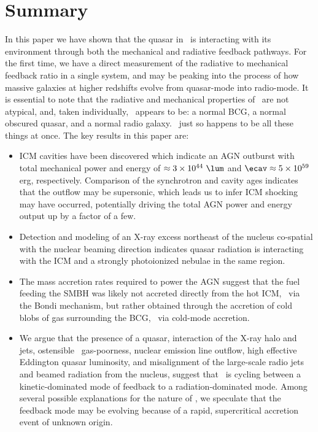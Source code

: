 \documentclass[useAMS,usenatbib]{mn2e}
\begin{document}
\section{Summary}
\label{sec:summ}

In this paper we have shown that the quasar in \inine\ is interacting
with its environment through both the mechanical and radiative
feedback pathways. For the first time, we have a direct measurement of
the radiative to mechanical feedback ratio in a single system, and may
be peaking into the process of how massive galaxies at higher
redshifts evolve from quasar-mode into radio-mode. It is essential to
note that the radiative and mechanical properties of \irs\ are not
atypical, and, taken individually, \irs\ appears to be: a normal BCG,
a normal obscured quasar, and a normal radio galaxy. \irs\ just so
happens to be all these things at once. The key results in this paper
are:
\begin{itemize}
\item ICM cavities have been discovered which indicate an AGN outburst
  with total mechanical power and energy of $\approx 3 \times 10^{44}
  ~\lum$ and $\ecav \approx 5 \times 10^{59}$ erg,
  respectively. Comparison of the synchrotron and cavity ages
  indicates that the outflow may be supersonic, which leads us to
  infer ICM shocking may have occurred, potentially driving the total
  AGN power and energy output up by a factor of a few.
\item Detection and modeling of an X-ray excess northeast of the
  nucleus co-spatial with the nuclear beaming direction indicates
  quasar radiation is interacting with the ICM and a strongly
  photoionized nebulae in the same region.
\item The mass accretion rates required to power the AGN suggest that
  the fuel feeding the SMBH was likely not accreted directly from the
  hot ICM, \ie\ via the Bondi mechanism, but rather obtained through
  the accretion of cold blobs of gas surrounding the BCG, \ie\ via
  cold-mode accretion.
\item We argue that the presence of a quasar, interaction of the X-ray
  halo and jets, ostensible \irs\ gas-poorness, nuclear emission line
  outflow, high effective Eddington quasar luminosity, and
  misalignment of the large-scale radio jets and beamed radiation from
  the nucleus, suggest that \irs\ is cycling between a
  kinetic-dominated mode of feedback to a radiation-dominated
  mode. Among several possible explanations for the nature of \irs, we
  speculate that the feedback mode may be evolving because of a rapid,
  supercritical accretion event of unknown origin.
\end{itemize}
\end{document}
